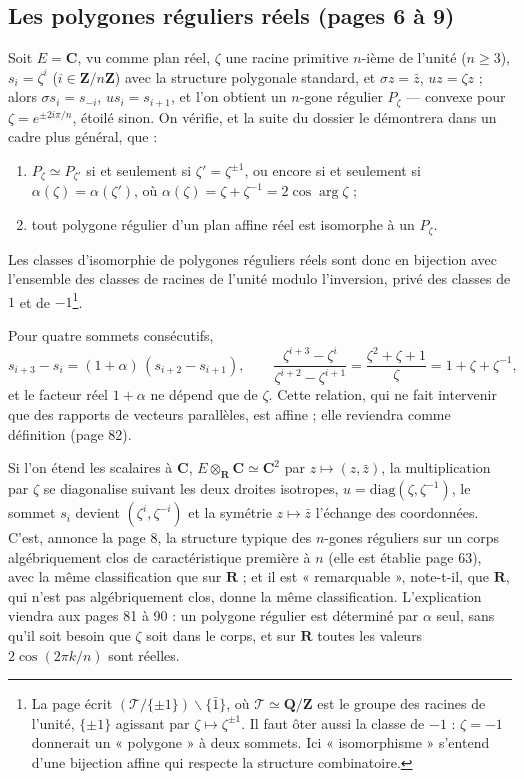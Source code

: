 \documentclass[11pt,a4paper]{article}
\begin{document}
\subsection*{Les polygones réguliers réels (pages 6 à 9)}

Soit $E = \mathbf{C}$, vu comme plan réel, $\zeta$ une racine primitive
$n$-ième de l'unité ($n \geq 3$), $s_i = \zeta^i$ ($i \in
\mathbf{Z}/n\mathbf{Z}$) avec la structure polygonale standard, et $\sigma z =
\bar z$, $u z = \zeta z$ ; alors $\sigma s_i = s_{-i}$, $u s_i = s_{i+1}$, et
l'on obtient un $n$-gone régulier $P_\zeta$ --- convexe pour $\zeta =
e^{\pm 2i\pi/n}$, étoilé sinon. On vérifie, et la suite du dossier le
démontrera dans un cadre plus général, que :
\begin{enumerate}
  \item[a)] $P_\zeta \simeq P_{\zeta'}$ si et seulement si $\zeta' =
    \zeta^{\pm 1}$, ou encore si et seulement si $\alpha(\zeta) =
    \alpha(\zeta')$, où $\alpha(\zeta) = \zeta + \zeta^{-1} = 2\cos\arg\zeta$ ;
  \item[b)] tout polygone régulier d'un plan affine réel est isomorphe à un
    $P_\zeta$.
\end{enumerate}
Les classes d'isomorphie de polygones réguliers réels sont donc en bijection
avec l'ensemble des classes de racines de l'unité modulo l'inversion, privé
des classes de $1$ et de $-1$\footnote{La page écrit
$(\mathcal{T}/\{\pm 1\}) \smallsetminus \{\bar 1\}$, où $\mathcal{T} \simeq
\mathbf{Q}/\mathbf{Z}$ est le groupe des racines de l'unité, $\{\pm 1\}$
agissant par $\zeta \mapsto \zeta^{\pm 1}$. Il faut ôter aussi la classe de
$-1$ : $\zeta = -1$ donnerait un « polygone » à deux sommets. Ici
« isomorphisme » s'entend d'une bijection affine qui respecte la structure
combinatoire.}.

Pour quatre sommets consécutifs,
\[
  s_{i+3} - s_i = (1 + \alpha)\,(s_{i+2} - s_{i+1}), \qquad
  \frac{\zeta^{i+3} - \zeta^i}{\zeta^{i+2} - \zeta^{i+1}}
  = \frac{\zeta^2 + \zeta + 1}{\zeta} = 1 + \zeta + \zeta^{-1} ,
\]
et le facteur réel $1 + \alpha$ ne dépend que de $\zeta$. Cette relation, qui
ne fait intervenir que des rapports de vecteurs parallèles, est affine ; elle
reviendra comme définition (page 82).

Si l'on étend les scalaires à $\mathbf{C}$, $E \otimes_{\mathbf{R}} \mathbf{C}
\simeq \mathbf{C}^2$ par $z \mapsto (z, \bar z)$, la multiplication par
$\zeta$ se diagonalise suivant les deux droites isotropes,
$u = \mathrm{diag}(\zeta, \zeta^{-1})$, le sommet $s_i$ devient $(\zeta^i,
\zeta^{-i})$ et la symétrie $z \mapsto \bar z$ l'échange des coordonnées.
C'est, annonce la page 8, la structure typique des $n$-gones réguliers sur un
corps algébriquement clos de caractéristique première à $n$ (elle est établie
page 63), avec la même classification que sur $\mathbf{R}$ ; et il est
« remarquable », note-t-il, que $\mathbf{R}$, qui n'est pas algébriquement
clos, donne la même classification. L'explication viendra aux pages 81
à 90 : un polygone régulier est déterminé par $\alpha$ seul, sans qu'il soit
besoin que $\zeta$ soit dans le corps, et sur $\mathbf{R}$ toutes les valeurs
$2\cos(2\pi k/n)$ sont réelles.
\end{document}
